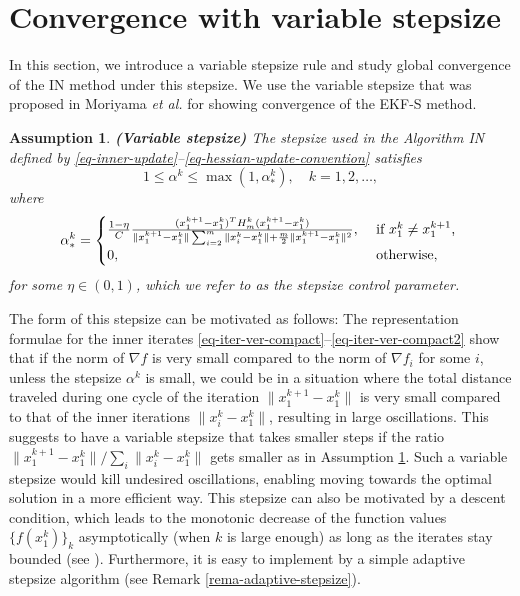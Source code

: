 \documentclass[final,numbook]{svjour3}
\newtheorem{assumption}[property]{Assumption}
\begin{document}
\section{Convergence with variable stepsize}
\label{sec-conv-variable-stepsize}
In this section, we introduce a variable stepsize rule and  study global convergence of the IN method under this stepsize. We use the variable stepsize that was proposed in Moriyama \textit{et al.} \cite{AlgEkfs2003} for showing convergence of the EKF-S method. 
\begin{assumption}\label{assum-stepsize} \textbf{(Variable stepsize)} The stepsize used in the Algorithm IN defined by \eqref{eq-inner-update}--\eqref{eq-hessian-update-convention} satisfies 
$$ 1 \leq \alpha^k \leq \max(1,\alpha_*^k), \quad k=1,2,\dots, $$
where
\large
\begin{equation}\label{def-alpha-star-k}  \alpha_*^k = 
\begin{cases} 
      \frac{1-\eta}{C} \frac{ (x_1^{k+1} - x_1^k)^T H_m^k (x_1^{k+1} - x_1^k)}{\|x_1^{k+1} - x_1^k\| \sum_{i=2}^m \|x_i^{k} - x_1^k\| + \frac{m}{2} \|x_1^{k+1} - x_1^k\|^2},   \hfill & \text{ if $x_1^k \neq x_1^{k+1}$, } \\
      0, \hfill & \text{ otherwise},
  \end{cases}
\end{equation}
\normalsize  
for some  $ \eta \in (0,1)$, which we refer to as the \emph{stepsize control parameter}.
\end{assumption}
The form of this stepsize can be motivated as follows: The representation formulae for the inner iterates \eqref{eq-iter-ver-compact}--\eqref{eq-iter-ver-compact2} show that if the norm of $\nabla f$ is very small compared to the norm of $\nabla f_i$ for some $i$, unless the stepsize $\alpha^k$ is small, we could be in a situation where the total distance traveled during one cycle of the iteration $\|x_1^{k+1} - x_1^{k}\|$ is very small compared to that of the inner iterations $\|x_i^k - x_1^{k}\|$, resulting in large oscillations. 
This suggests to have a variable stepsize that takes smaller steps if the ratio $\|x_1^{k+1} - x_1^{k}\|/\sum_{i}\|x_i^k - x_1^{k}\|$ gets smaller as in Assumption \ref{assum-stepsize}. Such a variable stepsize would kill undesired oscillations, enabling moving towards the optimal solution in a more efficient way. This stepsize can also be motivated by a descent condition, which leads to the monotonic decrease of the function values $\{f(x_1^k)\}_k$ asymptotically (when $k$ is large enough)  as long as the iterates stay bounded (see \cite[Lemma 4.1]{AlgEkfs2003}).  Furthermore, it is easy to implement by a simple adaptive stepsize algorithm (see Remark \ref{rema-adaptive-stepsize}). 
\end{document}
